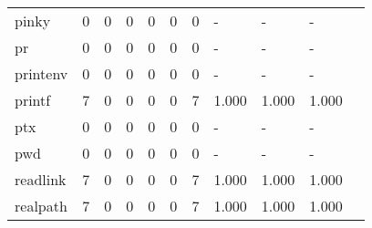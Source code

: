 \begin{longtable}{lp{1.10cm}p{1.10cm}p{1.10cm}p{1.10cm}p{1.10cm}p{1.10cm}p{1.10cm}p{1.10cm}p{1.10cm}p{1.10cm}}
pinky     &                      0 &                                  0 &                                 0 &                                0 &                                 0 &                               0 &                              - &                                     - &                                   - \\
pr        &                      0 &                                  0 &                                 0 &                                0 &                                 0 &                               0 &                              - &                                     - &                                   - \\
printenv  &                      0 &                                  0 &                                 0 &                                0 &                                 0 &                               0 &                              - &                                     - &                                   - \\
printf    &                      7 &                                  0 &                                 0 &                                0 &                                 0 &                               7 &                          1.000 &                                 1.000 &                               1.000 \\
ptx       &                      0 &                                  0 &                                 0 &                                0 &                                 0 &                               0 &                              - &                                     - &                                   - \\
pwd       &                      0 &                                  0 &                                 0 &                                0 &                                 0 &                               0 &                              - &                                     - &                                   - \\
readlink  &                      7 &                                  0 &                                 0 &                                0 &                                 0 &                               7 &                          1.000 &                                 1.000 &                               1.000 \\
realpath  &                      7 &                                  0 &                                 0 &                                0 &                                 0 &                               7 &                          1.000 &                                 1.000 &                               1.000 \\

\end{longtable}
